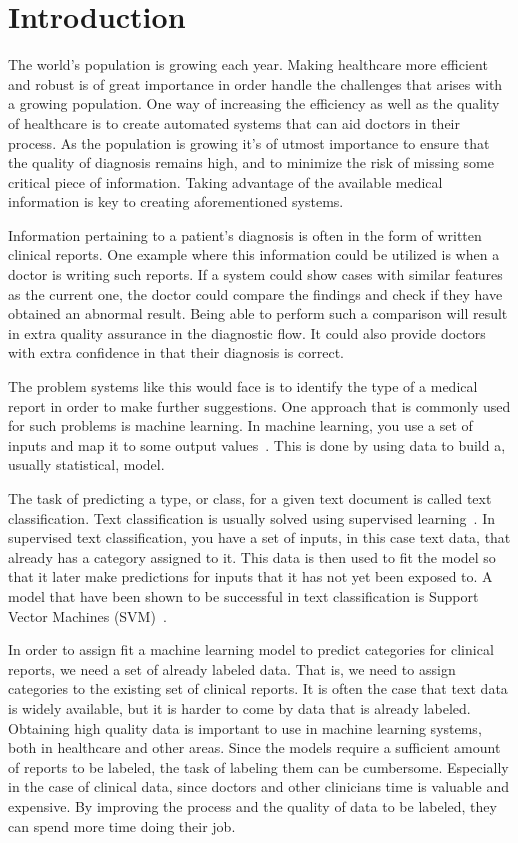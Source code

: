 \chapter{Introduction}
\label{cha:introduction}

The world's population is growing each year. 
Making healthcare more efficient and robust is of great importance in order handle the challenges that arises with a growing population.
One way of increasing the efficiency as well as the quality of healthcare is to create automated systems that can aid doctors in their process.
As the population is growing it's of utmost importance to ensure that the quality of diagnosis remains high, and to minimize the risk of missing some critical piece of information.
Taking advantage of the available medical information is key to creating aforementioned systems.

Information pertaining to a patient's diagnosis is often in the form of written clinical reports.
One example where this information could be utilized is when a doctor is writing such reports.
If a system could show cases with similar features as the current one, the doctor could compare the findings and check if they have obtained an abnormal result.
Being able to perform such a comparison will result in extra quality assurance in the diagnostic flow.
It could also provide doctors with extra confidence in that their diagnosis is correct.

The problem systems like this would face is to identify the type of a medical report in order to make further suggestions.
One approach that is commonly used for such problems is machine learning.
In machine learning, you use a set of inputs and map it to some output values~\cite{bishop2006pattern}.
This is done by using data to build a, usually statistical, model.

The task of predicting a type, or class, for a given text document is called text classification.
Text classification is usually solved using supervised learning~\cite{aggarwal2012surveyclass}. 
In supervised text classification, you have a set of inputs, in this case text data, that already has a category assigned to it.
This data is then used to fit the model so that it later make predictions for inputs that it has not yet been exposed to.
A model that have been shown to be successful in text classification is Support Vector Machines (SVM)~\cite{joachims1998text, aggarwal2012surveyclass, tong2001support}.

In order to assign fit a machine learning model to predict categories for clinical reports, we need a set of already labeled data.
That is, we need to assign categories to the existing set of clinical reports.
It is often the case that text data is widely available, but it is harder to come by data that is already labeled.
Obtaining high quality data is important to use in machine learning systems, both in healthcare and other areas.
Since the models require a sufficient amount of reports to be labeled, the task of labeling them can be cumbersome.
Especially in the case of clinical data, since doctors and other clinicians time is valuable and expensive.
By improving the process and the quality of data to be labeled, they can spend more time doing their job.

